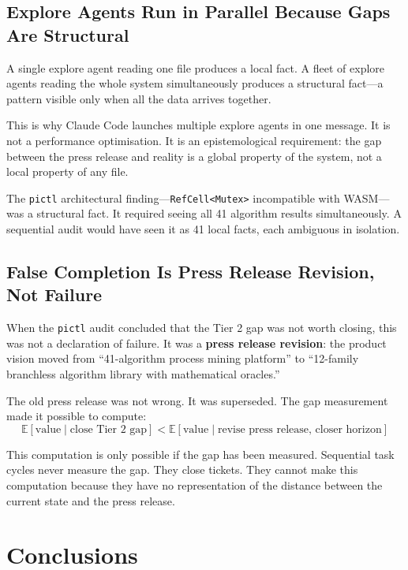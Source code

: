 \documentclass[11pt,a4paper]{article}
\newcommand{\code}[1]{\texttt{#1}}
\begin{document}
\subsection{Explore Agents Run in Parallel Because Gaps Are Structural}

A single explore agent reading one file produces a local fact.  A fleet of
explore agents reading the whole system simultaneously produces a structural
fact---a pattern visible only when all the data arrives together.

This is why Claude Code launches multiple explore agents in one message.  It is
not a performance optimisation.  It is an epistemological requirement: the gap
between the press release and reality is a global property of the system, not
a local property of any file.

The \code{pictl} architectural finding---\code{RefCell<Mutex>} incompatible
with WASM---was a structural fact.  It required seeing all 41 algorithm results
simultaneously.  A sequential audit would have seen it as 41 local facts, each
ambiguous in isolation.

\subsection{False Completion Is Press Release Revision, Not Failure}

When the \code{pictl} audit concluded that the Tier 2 gap was not worth
closing, this was not a declaration of failure.  It was a \textbf{press release
revision}: the product vision moved from ``41-algorithm process mining
platform'' to ``12-family branchless algorithm library with mathematical
oracles.''

The old press release was not wrong.  It was superseded.  The gap measurement
made it possible to compute:
\[
  \mathbb{E}[\text{value} \mid \text{close Tier 2 gap}]
  < \mathbb{E}[\text{value} \mid \text{revise press release, closer horizon}]
\]

This computation is only possible if the gap has been measured.  Sequential
task cycles never measure the gap.  They close tickets.  They cannot make this
computation because they have no representation of the distance between the
current state and the press release.

\section{Conclusions}
\end{document}
